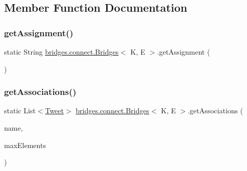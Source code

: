 \subsection{Member Function Documentation}
\hypertarget{classbridges_1_1connect_1_1_bridges_ae488b9bf0d696adb7f5a6ba7ce4ff2fd}{}\label{classbridges_1_1connect_1_1_bridges_ae488b9bf0d696adb7f5a6ba7ce4ff2fd} 
\subsubsection{\texorpdfstring{get\+Assignment()}{getAssignment()}}
{\footnotesize\ttfamily static String \hyperlink{classbridges_1_1connect_1_1_bridges}{bridges.\+connect.\+Bridges}$<$ K, E $>$.get\+Assignment (\begin{DoxyParamCaption}{ }\end{DoxyParamCaption})\hspace{0.3cm}{\ttfamily [static]}}

\hypertarget{classbridges_1_1connect_1_1_bridges_ad8f145f95222730fad3c0628b42f0128}{}\label{classbridges_1_1connect_1_1_bridges_ad8f145f95222730fad3c0628b42f0128} 
\subsubsection{\texorpdfstring{get\+Associations()}{getAssociations()}\hspace{0.1cm}{\footnotesize\ttfamily [1/2]}}
{\footnotesize\ttfamily static List$<$\hyperlink{classbridges_1_1data__src__dependent_1_1_tweet}{Tweet}$>$ \hyperlink{classbridges_1_1connect_1_1_bridges}{bridges.\+connect.\+Bridges}$<$ K, E $>$.get\+Associations (\begin{DoxyParamCaption}\item[{\hyperlink{classbridges_1_1data__src__dependent_1_1_twitter_account}{Twitter\+Account}}]{name,  }\item[{int}]{max\+Elements }\end{DoxyParamCaption})\hspace{0.3cm}{\ttfamily [static]}}

\hypertarget{classbridges_1_1connect_1_1_bridges_ac02211d6205c1270df11fcc271982d40}{}\label{classbridges_1_1connect_1_1_bridges_ac02211d6205c1270df11fcc271982d40} 
